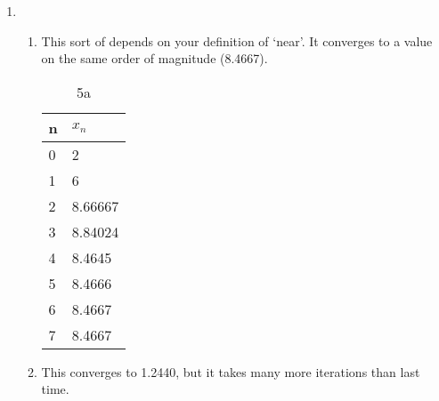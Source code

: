\documentclass[10pt,letterpaper]{article}
\begin{document}
\begin{enumerate}
\newpage

  \item %
    \begin{enumerate}
      \item
        This sort of depends on your definition of `near'. It converges to a value on the same order of magnitude (8.4667).

        \begin{table}[htb] 
          \centering
          \caption{5a}
          \begin{tabular}{l l}
            \hline\hline
            n & $x_n$ \\
            \hline
            0 & 2 \\
            1 & 6 \\
            2 & 8.66667 \\
            3 & 8.84024 \\
            4 & 8.4645 \\
            5 & 8.4666 \\
            6 & 8.4667 \\
            7 & 8.4667 \\
            \hline
          \end{tabular} 
        \end{table}

        \item
          This converges to 1.2440, but it takes many more iterations than last time.


\end{enumerate}
\end{enumerate}
\end{document}
